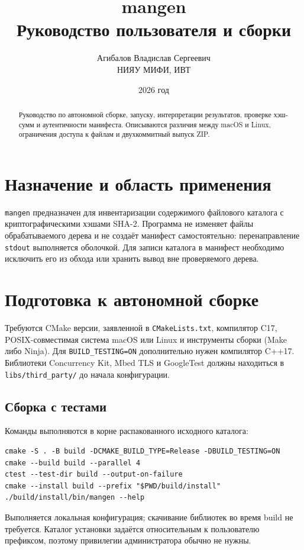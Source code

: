 \documentclass[12pt,a4paper]{article}
\title{mangen\\Руководство пользователя и сборки}
\author{Агибалов Владислав Сергеевич\\НИЯУ МИФИ, ИВТ}
\date{2026 год}
\begin{document}
\maketitle
\begin{abstract}
Руководство по автономной сборке, запуску, интерпретации результатов,
проверке хэш-сумм и аутентичности манифеста. Описываются различия между
macOS и Linux, ограничения доступа к файлам и двухкоммитный выпуск ZIP.
\end{abstract}
\tableofcontents
\newpage

\section{Назначение и область применения}

\texttt{mangen} предназначен для инвентаризации содержимого файлового
каталога с криптографическими хэшами SHA-2. Программа не изменяет файлы
обрабатываемого дерева и не создаёт манифест самостоятельно: перенаправление
\texttt{stdout} выполняется оболочкой. Для записи каталога в манифест
необходимо исключить его из обхода или хранить вывод вне проверяемого дерева.

\section{Подготовка к автономной сборке}

Требуются CMake версии, заявленной в \texttt{CMakeLists.txt},
компилятор C17, POSIX-совместимая система macOS или Linux и инструменты сборки
(Make либо Ninja). Для \texttt{BUILD\_TESTING=ON} дополнительно нужен
компилятор C++17. Библиотеки Concurrency Kit, Mbed TLS и GoogleTest должны
находиться в \texttt{libs/third\_party/} до начала конфигурации.

\subsection{Сборка с тестами}

Команды выполняются в корне распакованного исходного каталога:

\begin{lstlisting}
cmake -S . -B build -DCMAKE_BUILD_TYPE=Release -DBUILD_TESTING=ON
cmake --build build --parallel 4
ctest --test-dir build --output-on-failure
cmake --install build --prefix "$PWD/build/install"
./build/install/bin/mangen --help
\end{lstlisting}

Выполняется локальная конфигурация; скачивание библиотек во время build не
требуется. Каталог установки задаётся относительным к пользователю префиксом,
поэтому привилегии администратора обычно не нужны.
\end{document}
